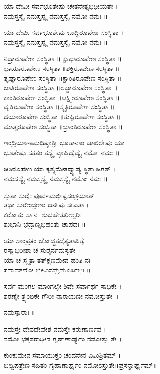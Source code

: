 ಯಾ ದೇವೀ ಸರ್ವಭೂತೇಷು ಚೇತನೇತ್ಯಭಿಧೀಯತೇ ।\\
ನಮಸ್ತಸ್ಯೈ ನಮಸ್ತಸ್ಯೈ ನಮಸ್ತಸ್ಯೈ ನಮೋ ನಮಃ ॥

ಯಾ ದೇವೀ ಸರ್ವಭೂತೇಷು ಬುದ್ಧಿರೂಪೇಣ ಸಂಸ್ಥಿತಾ ।\\
ನಮಸ್ತಸ್ಯೈ ನಮಸ್ತಸ್ಯೈ ನಮಸ್ತಸ್ಯೈ ನಮೋ ನಮಃ ॥

ನಿದ್ರಾರೂಪೇಣ ಸಂಸ್ಥಿತಾ ॥ ಕ್ಷುಧಾರೂಪೇಣ ಸಂಸ್ಥಿತಾ ॥\\
ಛಾಯಾರೂಪೇಣ ಸಂಸ್ಥಿತಾ ॥ಶಕ್ತಿರೂಪೇಣ ಸಂಸ್ಥಿತಾ ॥\\
ತೃಷ್ಣಾರೂಪೇಣ ಸಂಸ್ಥಿತಾ ॥ಕ್ಷಾಂತಿರೂಪೇಣ ಸಂಸ್ಥಿತಾ ॥\\
ಜಾತಿರೂಪೇಣ ಸಂಸ್ಥಿತಾ ॥ಲಜ್ಜಾರೂಪೇಣ ಸಂಸ್ಥಿತಾ ॥\\
ಕಾಂತಿರೂಪೇಣ ಸಂಸ್ಥಿತಾ ॥ಲಕ್ಷ್ಮೀರೂಪೇಣ ಸಂಸ್ಥಿತಾ ॥\\
ವೃತ್ತಿರೂಪೇಣ ಸಂಸ್ಥಿತಾ ॥ಸ್ಮೃತಿರೂಪೇಣ ಸಂಸ್ಥಿತಾ ॥\\
ದಯಾರೂಪೇಣ ಸಂಸ್ಥಿತಾ ॥ತುಷ್ಟಿರೂಪೇಣ ಸಂಸ್ಥಿತಾ ॥\\
ಮಾತೃರೂಪೇಣ ಸಂಸ್ಥಿತಾ ॥ಭ್ರಾಂತಿರೂಪೇಣ ಸಂಸ್ಥಿತಾ ॥

ಇಂದ್ರಿಯಾಣಾಮಧಿಷ್ಠಾತ್ರೀ ಭೂತಾನಾಂ ಚಾಖಿಲೇಷು ಯಾ ।\\
ಭೂತೇಷು ಸತತಂ ತಸ್ಯೈ ವ್ಯಾಪ್ತಿದೈವ್ಯೈ ನಮೋ ನಮಃ ॥

ಚಿತಿರೂಪೇಣ ಯಾ ಕೃತ್ಸ್ನಮೇತದ್ವ್ಯಾಪ್ಯ ಸ್ಥಿತಾ ಜಗತ್ ।\\
ನಮಸ್ತಸ್ಯೈ ನಮಸ್ತಸ್ಯೈ ನಮಸ್ತಸ್ಯೈ ನಮೋ ನಮಃ ॥

ಸ್ತುತಾ ಸುರೈಃ ಪೂರ್ವಮಭೀಷ್ಟಸಂಶ್ರಯಾತ್\\ತಥಾ ಸುರೇಂದ್ರೇಣು ದಿನೇಷು ಸೇವಿತಾ ।\\
ಕರೋತು ಸಾ ನಃ ಶುಭಹೇತುರೀಶ್ವರೀ\\ ಶುಭಾನಿ ಭದ್ರಾಣ್ಯಭಿಹಂತು ಚಾಪದಃ ॥

ಯಾ ಸಾಂಪ್ರತಂ ಚೋದ್ಧತದೈತ್ಯತಾಪಿತೈ\\ರಸ್ಮಾಭಿರೀಶಾ ಚ ಸುರೈರ್ನಮಸ್ಯತೇ ।\\
ಯಾ ಚ ಸ್ಮೃತಾ ತತ್ಕ್ಷಣಮೇವ ಹಂತಿ ನಃ\\ ಸರ್ವಾಪದೋ ಭಕ್ತಿವಿನಮ್ರಮೂರ್ತಿಭಿಃ ॥

ಸರ್ವ ಮಂಗಲ ಮಾಂಗಲ್ಯೇ ಶಿವೇ ಸರ್ವಾರ್ಥ ಸಾಧಿಕೇ ।\\ಶರಣ್ಯೇ ತ್ರ್ಯಂಬಕೇ ಗೌರೀ ನಾರಾಯಣೀ ನಮೋಸ್ತುತೇ ॥

ನಮಸ್ಕಾರಾಃ ॥

ನಮಸ್ತೇ ದೇವದೇವೇಶ ನಮಸ್ತೇ ಕರುಣಾರ್ಣವ ।\\ ನಮೋ ಭಕ್ತಪರಾಧೀನ ಗೃಹಾಣಾರ್ಘ್ಯಂ ನಮೋಸ್ತು ತೇ ॥

ಕುಂಕುಮೇನ ಸಮಾಯುಕ್ತಂ ಚಂದನೇನ ವಿಮಿಶ್ರಿತಮ್ ।\\ಬಿಲ್ವಪತ್ರೇಣ ಸಹಿತಂ ಗೃಹಾಣಾರ್ಘ್ಯಂ ನಮೋಽಸ್ತುತೇ॥ಪ್ರಸನ್ನಾರ್ಘ್ಯಮ್॥\\

